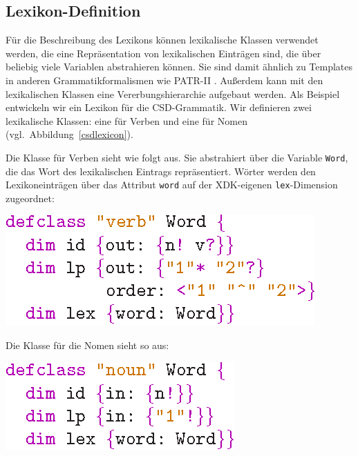 \subsection{Lexikon-Definition}

F\"ur die Beschreibung des Lexikons k\"onnen lexikalische Klassen
verwendet werden, die eine Repr\"asentation von lexikalischen
Eintr\"agen sind, die \"uber beliebig viele Variablen abstrahieren
k\"onnen. Sie sind damit \"ahnlich zu Templates in anderen
Grammatikformalismen wie PATR-II \cite{Shieber84}. Au{\ss}erdem kann
mit den lexikalischen Klassen eine Vererbungshierarchie aufgebaut
werden. Als Beispiel entwickeln wir ein Lexikon f\"ur die
CSD-Grammatik. Wir definieren zwei lexikalische Klassen: eine f\"ur
Verben und eine f\"ur Nomen (vgl.\ Abbildung~\ref{csdlexicon}).

Die Klasse f\"ur Verben sieht wie folgt aus. Sie abstrahiert \"uber
die Variable {\tt Word}, die das Wort des lexikalischen Eintrags
repr\"asentiert. W\"orter werden den Lexikoneintr\"agen \"uber das
Attribut {\tt word} auf der XDK-eigenen {\tt lex}-Dimension
zugeordnet:
\begin{center}
\includegraphics[scale=1.0]{eps/verb}
\end{center}

Die Klasse f\"ur die Nomen sieht so aus:
\begin{center}
\includegraphics[scale=1.0]{eps/noun}
\end{center}

